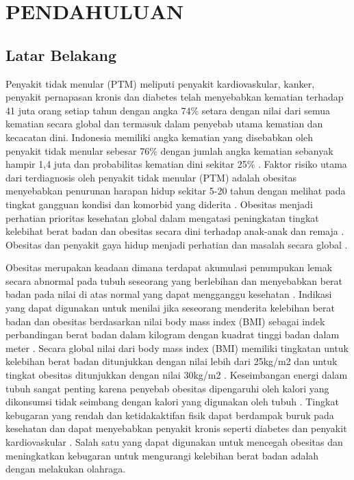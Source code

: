 \chapter{PENDAHULUAN}
\label{chap:pendahuluan}


\section{Latar Belakang}
\label{sec:latarbelakang}

Penyakit tidak menular (PTM) meliputi penyakit kardiovaskular, kanker, penyakit pernapasan kronis dan diabetes telah menyebabkan kematian terhadap 41 juta orang setiap tahun dengan angka 74\% setara dengan nilai dari semua kematian secara global dan termasuk dalam penyebab utama kematian dan kecacatan dini. Indonesia memiliki angka kematian yang disebabkan oleh penyakit tidak menular sebesar 76\% dengan jumlah angka kematian sebanyak hampir 1,4 juta dan probabilitas kematian dini sekitar 25\% \parencite{who1}. Faktor risiko utama dari terdiagnosis oleh penyakit tidak menular (PTM) adalah obesitas menyebabkan penurunan harapan hidup sekitar 5-20 tahun dengan melihat pada tingkat gangguan kondisi dan komorbid yang diderita \parencite{Bluher}. Obesitas menjadi perhatian prioritas kesehatan global dalam mengatasi peningkatan tingkat kelebihat berat badan dan obesitas secara dini terhadap anak-anak dan remaja \parencite{who2}. Obesitas dan penyakit gaya hidup menjadi perhatian dan masalah secara global \parencite{Caballero}.

Obesitas merupakan keadaan dimana terdapat akumulasi penumpukan lemak secara abnormal pada tubuh seseorang yang berlebihan dan menyebabkan berat badan pada nilai di atas normal yang dapat mengganggu kesehatan \parencite{Safaei}. Indikasi yang dapat digunakan untuk menilai jika seseorang menderita kelebihan berat badan dan obesitas berdasarkan nilai body mass index (BMI) sebagai indek perbandingan berat badan dalam kilogram dengan kuadrat tinggi badan dalam meter \parencite{Bohlen}. Secara global nilai dari body mass index (BMI) memiliki tingkatan untuk kelebihan berat badan ditunjukkan dengan nilai lebih dari 25kg/m2 dan untuk tingkat obesitas ditunjukkan dengan nilai 30kg/m2 \parencite{Lobstein}. Keseimbangan energi dalam tubuh sangat penting karena penyebab obesitas dipengaruhi oleh kalori yang dikonsumsi tidak seimbang dengan kalori yang digunakan oleh tubuh \parencite{Kevin}. Tingkat kebugaran yang rendah dan ketidakaktifan fisik dapat berdampak buruk pada kesehatan dan dapat menyebabkan penyakit kronis seperti diabetes dan penyakit kardiovaskular \parencite{Anderson}. Salah satu yang dapat digunakan untuk mencegah obesitas dan meningkatkan kebugaran untuk mengurangi kelebihan berat badan adalah dengan melakukan olahraga.

